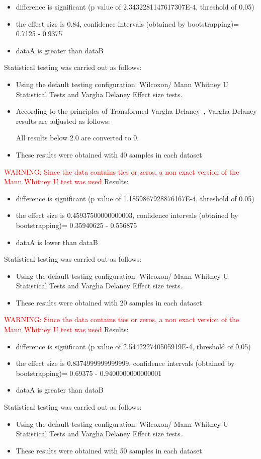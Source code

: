 \documentclass[]{article}
\begin{document}
\begin{itemize}
\item{difference is significant (p value of 2.3432281147617307E-4, threshold of 0.05)}
\item{the effect size is 0.84, confidence intervals (obtained by bootstrapping)= 0.7125 - 0.9375}
\item{dataA is greater than dataB}
\end{itemize}Statistical testing was carried out as follows: \begin{itemize}
\item{Using the default testing configuration: Wilcoxon/ Mann Whitney U Statistical Tests and Vargha Delaney Effect size tests.}
\item{According to the principles of Transformed Vargha Delaney~\cite{Neumann2015}, Vargha Delaney results are adjusted as follows:
 
All results below 2.0 are converted to 0.}
\item{These results were obtained with 40 samples in each dataset}
\end{itemize}
\textcolor{Red}{WARNING: Since the data contains ties or zeros, a non exact version of the Mann Whitney U test was used
}
Results:
\begin{itemize}
\item{difference is significant (p value of 1.1859867928876167E-4, threshold of 0.05)}
\item{the effect size is 0.45937500000000003, confidence intervals (obtained by bootstrapping)= 0.35940625 - 0.556875}
\item{dataA is lower than dataB}
\end{itemize}Statistical testing was carried out as follows: \begin{itemize}
\item{Using the default testing configuration: Wilcoxon/ Mann Whitney U Statistical Tests and Vargha Delaney Effect size tests.}
\item{These results were obtained with 20 samples in each dataset}
\end{itemize}
\textcolor{Red}{WARNING: Since the data contains ties or zeros, a non exact version of the Mann Whitney U test was used
}
Results:
\begin{itemize}
\item{difference is significant (p value of 2.544222740505919E-4, threshold of 0.05)}
\item{the effect size is 0.8374999999999999, confidence intervals (obtained by bootstrapping)= 0.69375 - 0.9400000000000001}
\item{dataA is greater than dataB}
\end{itemize}Statistical testing was carried out as follows: \begin{itemize}
\item{Using the default testing configuration: Wilcoxon/ Mann Whitney U Statistical Tests and Vargha Delaney Effect size tests.}
\item{These results were obtained with 50 samples in each dataset}
\end{itemize}
\end{document}
